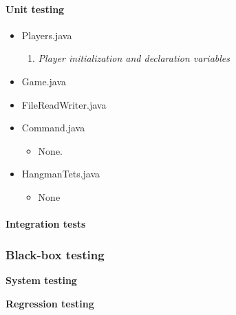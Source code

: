 \documentclass{article}
\begin{document}
			\paragraph{Unit testing}%


			\begin{itemize}
			\item Players.java
				\begin{enumerate}
				\item
				\textit{Player initialization and declaration variables}
				\end{enumerate}


			\item Game.java
			\item FileReadWriter.java

			\item Command.java
				\begin{itemize}
				\item None.
				\end{itemize}

			\item HangmanTets.java
				\begin{itemize}
				\item None
				\end{itemize}
			\end{itemize}



			\paragraph{\textbf{Integration tests}}



	\subsubsection{Black-box testing}
	\textbf{System testing\newline}


	\textbf{Regression testing}%
\end{document}

